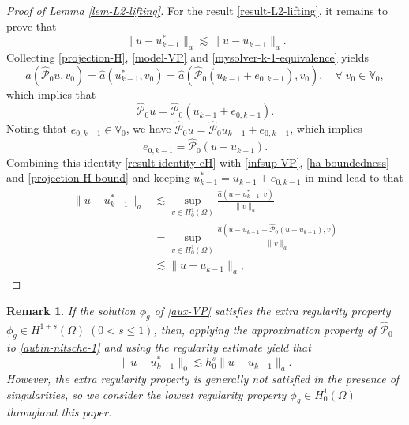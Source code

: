 \documentclass[preprint,times]{elsarticle}%
\newtheorem{remark}{Remark}[section]
\numberwithin{algorithm}{section}
\numberwithin{equation}{section}
\newcommand{\anorm}[1]{\|#1\|_a}
\newcommand{\ha}{\hat{a}}
\newcommand{\hmcP}{\hat{\mathcal{P}}}
\newcommand{\mbV}{\mathbb{V}}
\def\leq{\leqslant}
\begin{document}
\begin{proof}[Proof of Lemma \ref{lem-L2-lifting}]
For the result \eqref{result-L2-lifting}, it remains to prove that 
\begin{equation*}
	\|u-u_{k-1}^*\|_a \lesssim \anorm{u-u_{k-1}}. 
\end{equation*}
Collecting \eqref{projection-H}, \eqref{model-VP} and \eqref{mysolver-k-1-equivalence} yields 
	\begin{equation*}
		\ha(\hmcP_0 u,v_0) = \ha(u_{k-1}^*,v_0) = \ha(\hmcP_0(u_{k-1}+e_{0,k-1}),v_0), \quad \forall \; v_0 \in \mbV_0, 
	\end{equation*}
which implies that  
	\begin{equation*}
		\hmcP_0 u = \hmcP_0 (u_{k-1} + e_{0,k-1}).
	\end{equation*}
Noting thtat $e_{0,k-1} \in \mbV_0$, we have $\hmcP_0 u = \hmcP_0 u_{k-1} + e_{0,k-1}$, which implies
\begin{equation}\label{result-identity-eH}
	 e_{0,k-1} = \hmcP_0 (u-u_{k-1}).
	\end{equation} 
Combining this identity \eqref{result-identity-eH} with \eqref{infsup-VP}, \eqref{ha-boundedness} and \eqref{projection-H-bound} and keeping $u_{k-1}^* = u_{k-1}+e_{0,k-1}$ in mind lead to that 
	\begin{align}
		\anorm{u-u_{k-1}^*} &\lesssim \sup_{v \in H_0^1(\Omega)}\frac{\ha(u-u_{k-1}^*,v)}{\anorm{v}} \nonumber\\
							&= \sup_{v \in H_0^1(\Omega)}\frac{\ha(u-u_{k-1}-\hmcP_0 (u-u_{k-1}),v)}{\anorm{v}}\nonumber\\
						   &\lesssim \anorm{u-u_{k-1}}, \nonumber
    \end{align}
\end{proof}

\begin{remark}If the solution $\phi_g$ of \eqref{aux-VP} satisfies the extra regularity property $\phi_g \in H^{1+s}(\Omega) \; (0 < s \leq 1)$, then, applying the approximation property of $\hmcP_0$ \cite[Lemma 2.4]{XuJC96:1759} to \eqref{aubin-nitsche-1} and using the regularity estimate yield that 
	\begin{equation*}
		\|u-u_{k-1}^*\|_0 \lesssim h_0^s \anorm{u-u_{k-1}}. 
	\end{equation*} 
However, the extra regularity property is generally not satisfied in the presence of singularities, so we consider the lowest regularity property $\phi_g \in H_0^1(\Omega)$ throughout this paper. 
\end{remark}
\end{document}
